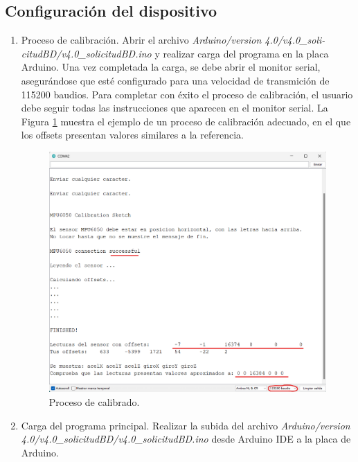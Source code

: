 \subsection{Configuración del dispositivo}
\begin{enumerate}
    \item Proceso de calibración. Abrir el archivo \textit{Arduino/version 4.0/v4.0\_soli-\\citudBD/v4.0\_solicitudBD.ino} y realizar carga del programa en la placa Arduino. Una vez completada la carga, se debe abrir el monitor serial, asegurándose que esté configurado para una velocidad de transmición de 115200 baudios. Para completar con éxito el proceso de calibración, el usuario debe seguir todas las instrucciones que aparecen en el monitor serial. La Figura \ref{fig:calibrado} muestra el ejemplo de un proceso de calibración adecuado, en el que los offsets presentan valores similares a la referencia.
    \begin{figure}[h]
        \centering
        \includegraphics[width=1\textwidth]{img/B2_InstalacionPuestaMarcha/calibrado_subrayado.png}
        \caption{Proceso de calibrado.}
        \label{fig:calibrado}
    \end{figure}
    
    \item Carga del programa principal. Realizar la subida del archivo \textit{Arduino/version 4.0/v4.0\_solicitudBD/v4.0\_solicitudBD.ino} desde Arduino IDE a la placa de Arduino.
\end{enumerate}

